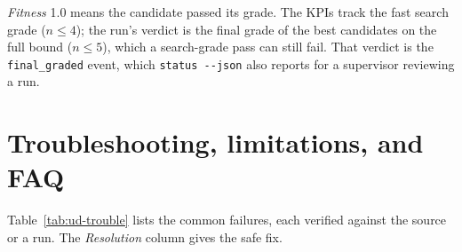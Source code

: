 \emph{Fitness} 1.0 means the candidate passed its grade. The KPIs track the
fast search grade ($n \le 4$); the run's verdict is the final grade of the best
candidates on the full bound ($n \le 5$), which a search-grade pass can still
fail. That verdict is the \texttt{final\_graded} event, which
\texttt{status -{}-json} also reports for a supervisor reviewing a run.

\section{Troubleshooting, limitations, and FAQ}
\label{sec:ud-trouble}

Table~\ref{tab:ud-trouble} lists the common failures, each verified against the
source or a run. The \emph{Resolution} column gives the safe fix.

